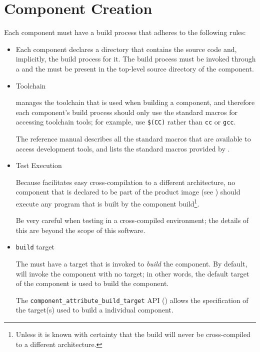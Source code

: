 \section{Component \makefile Creation}\label{wrap:component-makefile}

Each component must have a build process that adheres to the following
rules:

\begin{itemize}
\item \makefile

  Each component declares a directory that contains the source code
  and, implicitly, the build process for it.  The build process must
  be invoked through a \makefile and the \makefile must be present in
  the top-level source directory of the component.

\item Toolchain

  \lmsbw manages the toolchain that is used when building a component,
  and therefore each component's build process should only use the
  standard macros for accessing toolchain tools; for example, use
  \texttt{\$(CC)} rather than \texttt{cc} or \texttt{gcc}.

  The \gnumake reference manual describes all the standard macros that
  are available to access development tools, and
   lists the standard macros provided
  by \lmsbw.

\item Test Execution

  Because \lmsbw facilitates easy cross-compilation to a different
  architecture, no component that is declared to be part of the
  product image (see ) should execute any
  program that is built by the component build\footnote{Unless it is
    known with certainty that the build will never be cross-compiled
    to a different architecture.}.

  Be very careful when testing in a cross-compiled environment; the
  details of this are beyond the scope of this software.

\item \texttt{build} target

  The \makefile must have a target that is invoked to \emph{build} the
  component.  By default, \lmsbw will invoke the component \makefile
  with no target; in other words, the default target of the component
  \makefile is used to build the component.

  The \texttt{component\_attribute\_build\_target} API
  () allows the
  specification of the target(s) used to build a individual component.


\end{itemize}
